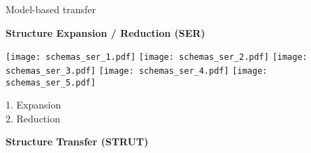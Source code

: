 \begin{frame}{Model-based transfer}

\centering\citet{segev2017learn}

\begin{minipage}[t]{0.49\linewidth}
    \vspace{0pt}
    \centering
    \textbf{Structure Expansion / Reduction (SER)}
    
    \renewcommand{\ratio}{0.55}
    \begin{overprint}
        \centering\texttt{[image: schemas\_ser\_1.pdf]}
        \centering\texttt{[image: schemas\_ser\_2.pdf]}
        \centering\texttt{[image: schemas\_ser\_3.pdf]}
        \centering\texttt{[image: schemas\_ser\_4.pdf]}
        \centering\texttt{[image: schemas\_ser\_5.pdf]}
    \end{overprint}
    
    \pause \pause
    \textcolor{myblue}{1. Expansion}\\
    \pause
    \textcolor{myorange}{2. Reduction}\\
    \bigskip

\end{minipage}\hfill
\begin{minipage}[t]{0.49\linewidth}
    \vspace{0pt}
    \centering
    \pause \pause
    \textbf{Structure Transfer (STRUT)}
    

\end{minipage}
\end{frame}
